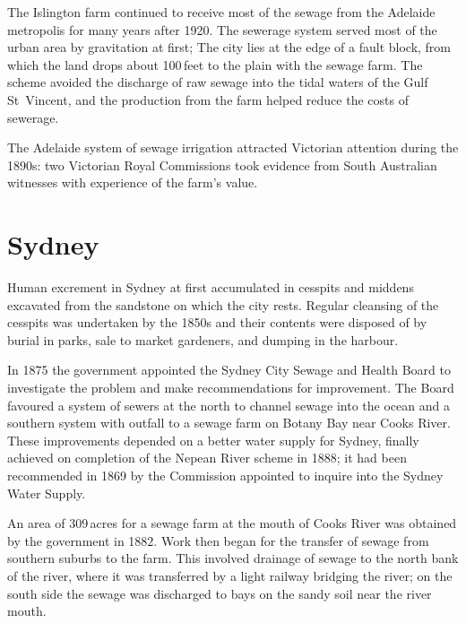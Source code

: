 The Islington farm continued to receive most of the sewage from the
Adelaide metropolis for many years after 1920.  The sewerage system
served most of the urban area by gravitation at first; The city lies
at the edge of a fault block, from which the land drops about
100\,feet to the plain with the sewage farm.  The scheme avoided the
discharge of raw sewage into the tidal waters of the Gulf St~Vincent,
 and the production from the farm helped reduce
the costs of sewerage.

The Adelaide system of sewage irrigation attracted Victorian attention
during the 1890s: two Victorian Royal Commissions took evidence from
South Australian witnesses with experience of the farm's
value.

\section*{Sydney}

Human excrement in Sydney at first accumulated in cesspits and middens
excavated from the sandstone on which the city rests.  Regular
cleansing of the cesspits was undertaken by the 1850s and their
contents were disposed of by burial in parks, sale to market
gardeners, and dumping in the harbour.

In 1875 the government appointed the Sydney City Sewage and Hea\-l\-th
Board to investigate the problem and make recommendations for
improvement.  The Board favoured a system of sewers at the north to
channel sewage into the ocean and a southern system with outfall to a
sewage farm on Botany Bay near Cooks River.  These improvements
depended on a better water supply for Sydney, finally achieved on
completion of the Nepean River  scheme in 1888; it
had been recommended in 1869 by the Commission appointed to inquire
into the Sydney Water Supply.

An area of 309\,acres for a sewage farm at the mouth of Cooks River
  was
obtained by the government in 1882.  Work then began for the transfer
of sewage from southern suburbs to the farm.  This involved drainage
of sewage to the north bank of the river, where it was transferred by
a light railway bridging the river; on the south side the sewage was
discharged to bays on the sandy soil near the river mouth.

